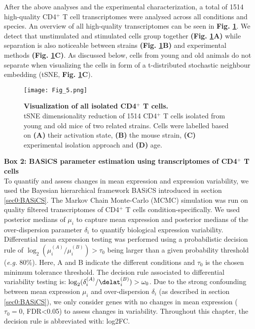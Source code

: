 \captionsetup[figure]{list=yes}

After the above analyses and the experimental characterization, a total of 1514 high-quality CD4$^+$ T cell transcriptomes were analysed across all conditions and species. An overview of all high-quality transcriptomes can be seen in \textbf{Fig. \ref{fig1:all_cells}}. We detect that unstimulated and stimulated cells group together \textbf{(Fig. \ref{fig1:all_cells}A)} while separation is also noticeable between strains \textbf{(Fig. \ref{fig1:all_cells}B)} and experimental methods \textbf{(Fig. \ref{fig1:all_cells}C)}. As discussed below, cells from young and old animals do not separate when visualizing the cells in form of a t-distributed stochastic neighbour embedding (tSNE, \textbf{Fig. \ref{fig1:all_cells}C}). 

\newpage

\begin{figure}[!hb]
\centering
\texttt{[image: Fig\_5.png]}
\caption[Visualization of all isolated CD4$^+$ T cells]{\textbf{Visualization of all isolated CD4$^+$ T cells.}\\
tSNE dimensionality reduction of 1514 CD4$^+$ T cells isolated from young and old mice of two related strains. Cells were labelled based on \textbf{(A)} their activation state, \textbf{(B)} the mouse strain, \textbf{(C)} experimental isolation approach and \textbf{(D)} age.}
\label{fig1:all_cells}
\end{figure}

\begin{Comment}
\textbf{Box 2: BASiCS parameter estimation using transcriptomes of CD4$^+$ T cells}\\
To quantify and assess changes in mean expression and expression variability, we used the Bayesian hierarchical framework BASiCS introduced in section \ref{sec0:BASiCS}. The Markov Chain Monte-Carlo (MCMC) simulation was run on quality filtered transcriptomes of CD4$^+$ T cells condition-specifically. We used posterior medians of $\mu_i$ to capture mean expression and posterior medians of the over-dispersion parameter $\delta_i$ to quantify biological expression variability. Differential mean expression testing was performed using a probabilistic decision rule of $\log_2(\mu_i^{(A)}/\mu_i^{(B)})>\tau_0$ being larger than a given probability threshold (\emph{e.g.} 80\%). Here, A and B indicate the different conditions and $\tau_0$ is the chosen minimum tolerance threshold. The decision rule associated to differential variability testing is: $\log_2(\delta_i^{(A)}/\delat_i^{(B)})>\omega_0$. Due to the strong confounding between mean expression $\mu_i$ and over-dispersion $\delta_i$ (as described in section \ref{sec0:BASiCS}), we only consider genes with no changes in mean expression ($\tau_0=0$, FDR<0.05) to assess changes in variability. Throughout this chapter, the decision rule is abbreviated with: log2FC. 
\end{Comment}

